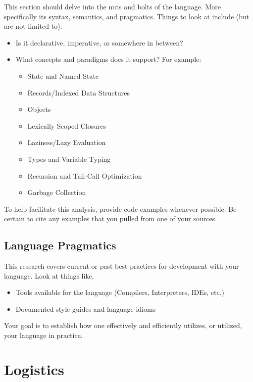 \documentclass[10pt]{article}
\begin{document}
This section should delve into the nuts and bolts of the language.  More specifically its syntax, semantics, and pragmatics. Things to look at include (but are not limited to):
\begin{itemize}
\item Is it declarative, imperative, or somewhere in between?
\item What concepts and paradigms does it support? For example:
\begin{itemize}
\item State and Named State
\item Records/Indexed Data Structures
\item Objects
\item Lexically Scoped Closures
\item Laziness/Lazy Evaluation 
\item Types and Variable Typing
\item Recursion and Tail-Call Optimization
\item Garbage Collection
\end{itemize}
\end{itemize}
To help facilitate this analysis, provide code examples whenever possible.  Be certain to cite any examples that you pulled from one of your sources.  

\subsection{Language Pragmatics}

This research covers current or past best-practices for development with your language.  Look at things like,
\begin{itemize}
\item Tools available for the language (Compilers, Interpreters, IDEs, etc.)
\item Documented style-guides and language idioms
\end{itemize}
Your goal is to establish how one effectively and efficiently utilizes, or utilized, your language in practice.  


\section{Logistics}
\end{document}
